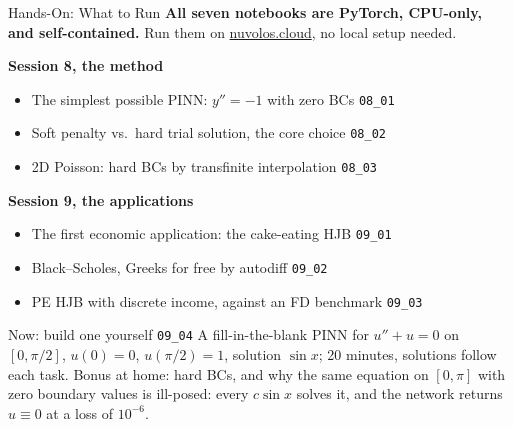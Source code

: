 \documentclass[aspectratio=169,11pt]{beamer}
\begin{document}
\begin{frame}{Hands-On: What to Run}
\vspace{-0.3em}
\textbf{All seven notebooks are PyTorch, CPU-only, and self-contained.} {\footnotesize Run them on \href{https://nuvolos.cloud}{nuvolos.cloud}, no local setup needed.}

\vspace{0.2em}
\textbf{Session 8, the method}
\begin{itemize}\setlength\itemsep{0pt}
    \item The simplest possible PINN: $y''=-1$ with zero BCs \hfill{\footnotesize\texttt{08\_01}}
    \item Soft penalty vs.\ hard trial solution, the core choice \hfill{\footnotesize\texttt{08\_02}}
    \item 2D Poisson: hard BCs by transfinite interpolation \hfill{\footnotesize\texttt{08\_03}}
\end{itemize}

\vspace{0.3em}
\textbf{Session 9, the applications}
\begin{itemize}\setlength\itemsep{0pt}
    \item The first economic application: the cake-eating HJB \hfill{\footnotesize\texttt{09\_01}}
    \item Black--Scholes, Greeks for free by autodiff \hfill{\footnotesize\texttt{09\_02}}
    \item PE HJB with discrete income, against an FD benchmark \hfill{\footnotesize\texttt{09\_03}}
\end{itemize}

\begin{exampleblock}{Now: build one yourself \hfill{\footnotesize\texttt{09\_04}}}
\footnotesize
A fill-in-the-blank PINN for $u''+u=0$ on $[0,\pi/2]$, $u(0)=0$, $u(\pi/2)=1$, solution $\sin x$; 20 minutes, solutions follow each task. Bonus at home: hard BCs, and why the same equation on $[0,\pi]$ with zero boundary values is ill-posed: every $c\sin x$ solves it, and the network returns $u \equiv 0$ at a loss of $10^{-6}$.
\end{exampleblock}
\end{frame}
\end{document}
